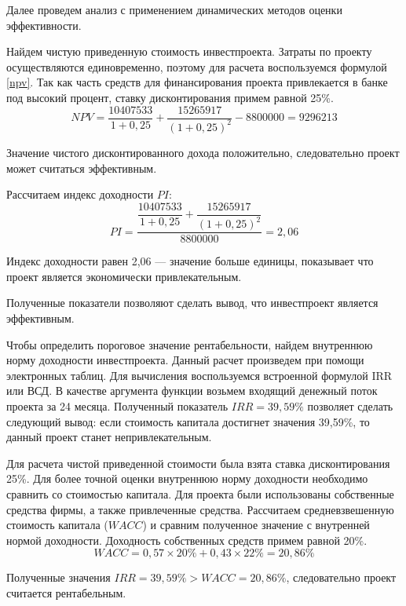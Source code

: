 Далее проведем анализ с применением динамических методов оценки эффективности.

Найдем чистую приведенную стоимость инвестпроекта. Затраты по проекту осуществляются единовременно, поэтому для расчета воспользуемся формулой \eqref{npv}. Так как часть средств для финансирования проекта привлекается в банке под высокий процент, ставку дисконтирования примем равной 25\%.
\begin{equation*}\label{npv_mod}
NPV =  \dfrac{10407533}{1+0,25} + \dfrac{15265917}{(1+0,25)^2}- 8800000 = 9296213
\end{equation*}

Значение чистого дисконтированного дохода положительно, следовательно проект может считаться эффективным.

Рассчитаем индекс доходности $PI$:
\begin{equation*}
PI = \dfrac{\dfrac{10407533}{1+0,25} + \dfrac{15265917}{(1+0,25)^2}}{8800000} = 2,06
\end{equation*}

Индекс доходности равен 2,06 --- значение больше единицы, показывает что проект является экономически привлекательным.

Полученные показатели позволяют сделать вывод, что инвестпроект является эффективным.

Чтобы определить пороговое значение рентабельности, найдем внутреннюю норму доходности инвестпроекта. Данный расчет произведем при помощи электронных таблиц. Для вычисления воспользуемся встроенной формулой IRR или ВСД. В качестве аргумента функции возьмем входящий денежный поток проекта за 24 месяца. Полученный показатель $IRR = 39,59\%$ позволяет сделать следующий вывод: если стоимость капитала достигнет значения 39,59\%, то данный проект станет непривлекательным.

Для расчета чистой приведенной стоимости была взята ставка дисконтирования 25\%. Для более точной оценки внутреннюю норму доходности необходимо сравнить со стоимостью капитала. Для проекта были использованы собственные средства фирмы, а также привлеченные средства. Рассчитаем средневзвешенную стоимость капитала ($WACC$) и сравним полученное значение с внутренней нормой доходности. Доходность собственных средств примем равной 20\%.
\begin{equation*}
WACC = 0,57 \times 20\% + 0,43 \times 22\% = 20,86\%
\end{equation*}

Полученные значения  $IRR = 39,59\% > WACC= 20,86\%$, следовательно проект считается рентабельным.



